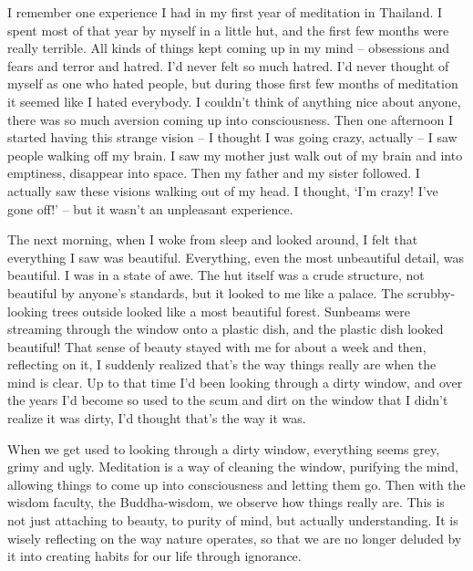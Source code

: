 I remember one experience I had in my first year of meditation in Thailand. I spent most of that year by myself in a little hut, and the first few months were really terrible. All kinds of things kept coming up in my mind -- obsessions and fears and terror and hatred. I'd never felt so much hatred. I'd never thought of myself as one who hated people, but during those first few months of meditation it seemed like I hated everybody. I couldn't think of anything nice about anyone, there was so much aversion coming up into consciousness. Then one afternoon I started having this strange vision -- I thought I was going crazy, actually -- I saw people walking off my brain. I saw my mother just walk out of my brain and into emptiness, disappear into space. Then my father and my sister followed. I actually saw these visions walking out of my head. I thought, `I'm crazy! I've gone off!' -- but it wasn't an unpleasant experience.

The next morning, when I woke from sleep and looked around, I felt that everything I saw was beautiful. Everything, even the most unbeautiful detail, was beautiful. I was in a state of awe. The hut itself was a crude structure, not beautiful by anyone's standards, but it looked to me like a palace. The scrubby-looking trees outside looked like a most beautiful forest. Sunbeams were streaming through the window onto a plastic dish, and the plastic dish looked beautiful! That sense of beauty stayed with me for about a week and then, reflecting on it, I suddenly realized that's the way things really are when the mind is clear. Up to that time I'd been looking through a dirty window, and over the years I'd become so used to the scum and dirt on the window that I didn't realize it was dirty, I'd thought that's the way it was.

When we get used to looking through a dirty window, everything seems grey, grimy and ugly. Meditation is a way of cleaning the window, purifying the mind, allowing things to come up into consciousness and letting them go. Then with the wisdom faculty, the Buddha-wisdom, we observe how things really are. This is not just attaching to beauty, to purity of mind, but actually understanding. It is wisely reflecting on the way nature operates, so that we are no longer deluded by it into creating habits for our life through \mbox{ignorance}.


